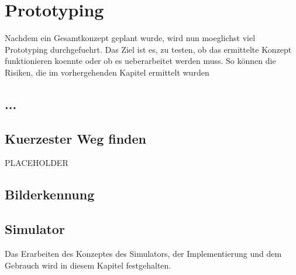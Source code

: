 \section{Prototyping}

Nachdem ein Gesamtkonzept geplant wurde, wird nun moeglichst viel Prototyping durchgefuehrt. Das Ziel ist es, zu testen, ob das ermittelte Konzept funktionieren koennte oder ob es ueberarbeitet werden muss. So können die Risiken, die im vorhergehenden Kapitel ermittelt wurden 

\subsection{...}

\subsection{Kuerzester Weg finden}

PLACEHOLDER

\subsection{Bilderkennung}

\subsection{Simulator}

Das Erarbeiten des Konzeptes des Simulators, der Implementierung und dem Gebrauch wird in diesem Kapitel festgehalten.